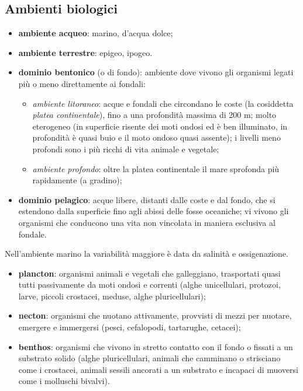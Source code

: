 \subsection{Ambienti biologici}

\begin{itemize}
  \item \textbf{ambiente acqueo}: marino, d'acqua dolce;
  \item \textbf{ambiente terrestre}: epigeo, ipogeo.
\end{itemize}

\begin{itemize}
  \item \textbf{dominio bentonico} (o di fondo): ambiente dove vivono gli organismi legati più o meno direttamente ai fondali:
    \begin{itemize}
      \item \textit{ambiente litoraneo}: acque e fondali che circondano le coste (la cosiddetta \textit{platea continentale}), fino a una profondità massima di 200 m; molto eterogeneo (in superficie risente dei moti ondosi ed è ben illuminato, in profondità è quasi buio e il moto ondoso quasi assente); i livelli meno profondi sono i più ricchi di vita animale e vegetale;
      \item \textit{ambiente profondo}: oltre la platea continentale il mare sprofonda più rapidamente (a gradino);
    \end{itemize}
  \item \textbf{dominio pelagico}: acque libere, distanti dalle coste e dal fondo, che si estendono dalla superficie fino agli abissi delle fosse oceaniche; vi vivono gli organismi che conducono una vita non vincolata in maniera esclusiva al fondale.
\end{itemize}
Nell'ambiente marino la variabilità maggiore è data da salinità e ossigenazione.

\begin{itemize}
  \item \textbf{plancton}: organismi animali e vegetali che galleggiano, trasportati quasi tutti passivamente da moti ondosi e correnti (alghe unicellulari, protozoi, larve, piccoli crostacei, meduse, alghe pluricellulari);
  \item \textbf{necton}: organismi che nuotano attivamente, provvisti di mezzi per nuotare, emergere e immergersi (pesci, cefalopodi, tartarughe, cetacei);
  \item \textbf{benthos}: organismi che vivono in stretto contatto con il fondo o fissati a un substrato solido (alghe pluricellulari, animali che camminano o strisciano come i crostacei, animali sessili ancorati a un substrato e incapaci di muoversi come i molluschi bivalvi).
\end{itemize}

